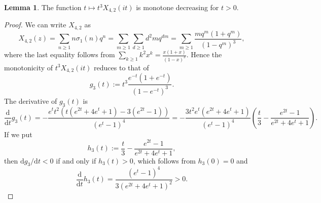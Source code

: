 \documentclass[10pt,reqno]{amsproc}
\newcommand{\dd}{\mathrm{d}}
\newcommand{\1}{\mathds{1}}	%
\theoremstyle{definition}
\newtheorem{lemma}[theorem]{Lemma}
\theoremstyle{remark}
\begin{document}
\begin{lemma}
    \label{lem:polymod_X42}
    The function $t \mapsto t^3 X_{4, 2}(it)$ is monotone decreasing for $t > 0$.
\end{lemma}
\begin{proof}
    We can write $X_{4, 2}$ as
    \begin{equation*}
        X_{4, 2}(z) = \sum_{n \ge 1} n \sigma_1(n) q^n = \sum_{m \ge 1} \sum_{d \ge 1} d^{2} m q^{dm} = \sum_{m \ge 1} \frac{m q^m (1 + q^m)}{(1 - q^m)^3},
    \end{equation*}
    where the last equality follows from $\sum_{k \ge 1} k^2 x^k = \frac{x(1+x)}{(1 - x)^3} $.
    Hence the monotonicity of $t^3 X_{4, 2}(it)$ reduces to that of
    \begin{equation*}
        g_3(t) := t^3 \frac{e^{-t}(1 + e^{-t})}{(1 - e^{-t})^3}.
    \end{equation*}
    The derivative of $g_3(t)$ is
    \begin{equation*}
        \frac{\dd}{\dd t} g_3(t) = -\frac{e^t t^2 (t(e^{2t} + 4 e^t + 1) - 3(e^{2t} - 1))}{(e^t - 1)^4} = - \frac{3t^2 e^t (e^{2t} + 4e^t + 1)}{(e^t - 1)^4} \left(\frac{t}{3} - \frac{e^{2t} - 1}{e^{2t} + 4e^t + 1}\right).
    \end{equation*}
    If we put
    \[
    h_3(t) := \frac{t}{3} - \frac{e^{2t} - 1}{e^{2t} + 4e^t + 1},
    \]
    then $\dd g_3 / \dd t < 0$ if and only if $h_3(t) > 0$, which follows from $h_3(0) = 0$ and
    \begin{equation*}
        \frac{\dd}{\dd t} h_3(t) = \frac{(e^t - 1)^4}{3(e^{2t} + 4e^t + 1)^2} > 0.
    \end{equation*}
\end{proof}
\end{document}
